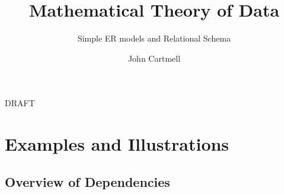 \documentclass[10pt,a4paper]{scrartcl}
\begin{document}
\title{Mathematical Theory of Data}
\subtitle{Simple ER models and Relational Schema}
\author{John Cartmell}
\maketitle
\begin{center}
DRAFT
\end{center}









\newpage
\appendix



\section{Examples and Illustrations}















\begin{landscape}
\section{Overview of Dependencies}

\end{landscape}
%
 

	 
\end{document}
